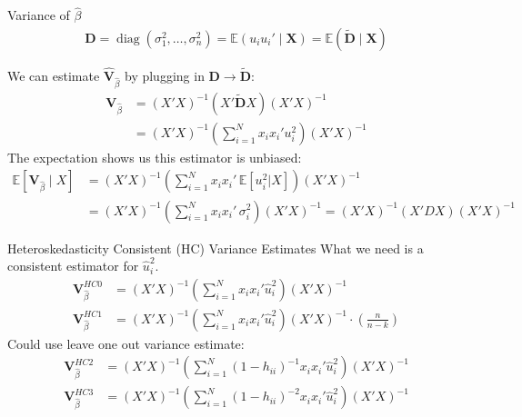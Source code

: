 \begin{frame}{Variance of $\widehat{\beta}$}
\begin{align*}
\mathbf { D } = \operatorname { diag } \left( \sigma _ { 1 } ^ { 2 } , \ldots , \sigma _ { n } ^ { 2 } \right)
= \mathbb { E } \left( u_i u_i'  \mid \mathbf { X } \right)
= \mathbb { E } \left( \widetilde{\mathbf{D}} \mid  \mathbf { X } \right)
\end{align*}

We can estimate $\widehat{\mathbf{V}}_{\widehat{\beta}}$ by plugging in $\mathbf{D} \rightarrow  \widetilde{\mathbf{D}} $:
\begin{align*}
\mathbf{V}_{\widehat{\beta}} &= (X'X)^{-1} (X'  \widetilde{\mathbf{D}} X) (X'X)^{-1} \\
&= (X'X)^{-1} \left(\sum_{i=1}^N x_i x_i' u_i^2  \right) (X'X)^{-1} 
\end{align*}
The expectation shows us this estimator is unbiased:
\begin{align*}
\mathbb{E}[\mathbf{V}_{\widehat{\beta}} \mid X]
&= (X'X)^{-1} \left(\sum_{i=1}^N x_i x_i'\, \mathbb{E}[u_i^2 | X] \right) (X'X)^{-1} \\
&= (X'X)^{-1} \left(\sum_{i=1}^N x_i x_i' \, \sigma_i^2 \right) (X'X)^{-1} = (X'X)^{-1} (X' D X) (X'X)^{-1} 
\end{align*}
\end{frame}



\begin{frame}{Heteroskedasticity Consistent (HC) Variance Estimates}
What we need is a consistent estimator for $\hat{u}^2_i$.
\begin{align*}
\mathbf{V}_{\widehat{\beta}}^{HC0}&= (X'X)^{-1} \left(\sum_{i=1}^N x_i x_i' \hat{u}_i^2 \right) (X'X)^{-1} \\
\mathbf{V}_{\widehat{\beta}}^{HC1}&= (X'X)^{-1} \left(\sum_{i=1}^N x_i x_i' \hat{u}_i^2 \right) (X'X)^{-1} \cdot \left(\frac{n}{n-k}  \right)
\end{align*}
Could use leave one out variance estimate:
\begin{align*}
\mathbf{V}_{\widehat{\beta}}^{HC2}&= (X'X)^{-1} \left(\sum_{i=1}^N (1-h_{ii})^{-1} x_i x_i' \hat{u}_i^2 \right) (X'X)^{-1} \\
\mathbf{V}_{\widehat{\beta}}^{HC3}&= (X'X)^{-1} \left(\sum_{i=1}^N (1-h_{ii})^{-2} x_i x_i' \hat{u}_i^2 \right) (X'X)^{-1} \\
\end{align*}
\end{frame}

